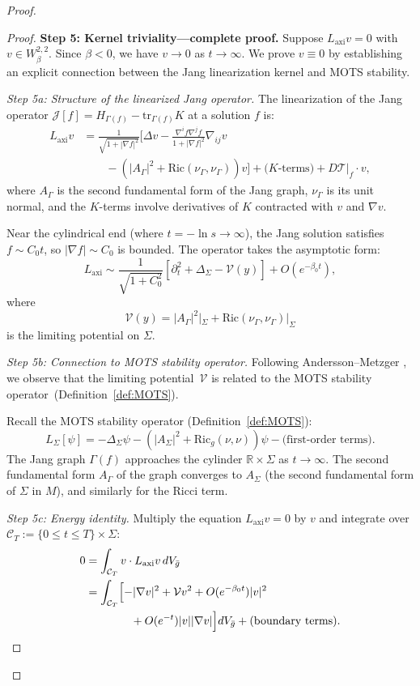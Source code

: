 \documentclass[12pt]{article}
\theoremstyle{plain}
\theoremstyle{definition}
\theoremstyle{remark}
\newcommand{\tr}{\mathrm{tr}}
\newcommand{\Ric}{\mathrm{Ric}}
\newcommand{\bg}{\bar{g}}
\begin{document}
\begin{proof}
\begin{proof}
\textbf{Step 5: Kernel triviality---complete proof.}
Suppose $L_{\mathrm{axi}} v = 0$ with $v \in W^{2,2}_\beta$. Since $\beta < 0$, we have $v \to 0$ as $t \to \infty$. We prove $v \equiv 0$ by establishing an explicit connection between the Jang linearization kernel and MOTS stability.

\textit{Step 5a: Structure of the linearized Jang operator.}
The linearization of the Jang operator $\mathcal{J}[f] = H_{\Gamma(f)} - \tr_{\Gamma(f)} K$ at a solution $f$ is:
\begin{align*}
L_{\mathrm{axi}} v &= \frac{1}{\sqrt{1 + |\nabla f|^2}}\biggl[\Delta v - \frac{\nabla^i f \nabla^j f}{1 + |\nabla f|^2}\nabla_{ij} v \\
&\qquad - (|A_\Gamma|^2 + \Ric(\nu_\Gamma, \nu_\Gamma))v\biggr] + \text{($K$-terms)} + D\mathcal{T}|_f \cdot v,
\end{align*}
where $A_\Gamma$ is the second fundamental form of the Jang graph, $\nu_\Gamma$ is its unit normal, and the $K$-terms involve derivatives of $K$ contracted with $v$ and $\nabla v$.

Near the cylindrical end (where $t = -\ln s \to \infty$), the Jang solution satisfies $f \sim C_0 t$, so $|\nabla f| \sim C_0$ is bounded. The operator takes the asymptotic form:
\[
L_{\mathrm{axi}} \sim \frac{1}{\sqrt{1 + C_0^2}}\left[\partial_t^2 + \Delta_\Sigma - \mathcal{V}(y)\right] 
+ O(e^{-\beta_0 t}),
\]
where 
\[
\mathcal{V}(y) = |A_\Gamma|^2|_\Sigma + \Ric(\nu_\Gamma, \nu_\Gamma)|_\Sigma
\]
is the limiting potential on $\Sigma$.

\textit{Step 5b: Connection to MOTS stability operator.}
Following Andersson--Metzger \cite[Section~3]{anderssonmetzger2009}, we observe that the limiting potential~$\mathcal{V}$ is related to the MOTS stability operator~(Definition~\ref{def:MOTS}).

Recall the MOTS stability operator (Definition~\ref{def:MOTS}):
\[
L_\Sigma[\psi] = -\Delta_\Sigma \psi - (|A_\Sigma|^2 + \Ric_g(\nu, \nu))\psi - \text{(first-order terms)}.
\]
The Jang graph $\Gamma(f)$ approaches the cylinder $\mathbb{R} \times \Sigma$ as $t \to \infty$. The second fundamental form $A_\Gamma$ of the graph converges to $A_\Sigma$ (the second fundamental form of $\Sigma$ in $M$), and similarly for the Ricci term.

\textit{Step 5c: Energy identity.}
Multiply the equation $L_{\mathrm{axi}} v = 0$ by $v$ and integrate over $\mathcal{C}_T := \{0 \leq t \leq T\} \times \Sigma$:
\begin{align}
0 &= \int_{\mathcal{C}_T} v \cdot L_{\mathrm{axi}} v \, dV_{\bg} \notag\\
&= \int_{\mathcal{C}_T} \Bigl[-|\nabla v|^2 + \mathcal{V} v^2 + O(e^{-\beta_0 t})|v|^2 \notag\\
&\qquad\qquad + O(e^{-t})|v||\nabla v|\Bigr] dV_{\bg} + \text{(boundary terms)}.
\end{align}


\end{proof}
\end{proof}
\end{document}
